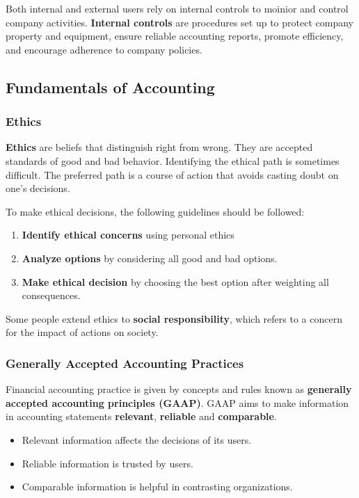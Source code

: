 \documentclass[../main.tex]{subfiles}
\begin{document}
	Both internal and external users rely on internal controls to moinior and 
	control company activities. \textbf{Internal controls} are procedures set 
	up to protect company property and equipment, ensure reliable accounting 
	reports, promote efficiency, and encourage adherence to company policies. 
	
	\subsection{Fundamentals of Accounting}
	
	\subsubsection{Ethics}
	\textbf{Ethics} are beliefs that distinguish right from wrong. They are 
	accepted standards of good and bad behavior. Identifying the ethical path 
	is sometimes difficult. The preferred path is a course of action that 
	avoids casting doubt on one's decisions. 
	
	To make ethical decisions, the following guidelines should be followed:
	\begin{enumerate}[noitemsep]
		\item \textbf{Identify ethical concerns} using personal ethics
		\item \textbf{Analyze options} by considering all good and bad options.
		\item \textbf{Make ethical decision} by choosing the best option after 
		weighting all consequences.
	\end{enumerate}
	
	Some people extend ethics to \textbf{social responsibility}, which refers 
	to a concern for the impact of actions on society. 
	
	\subsubsection{Generally Accepted Accounting Practices}
	
	Financial accounting practice is given by concepts and rules known as 
	\textbf{generally accepted accounting principles (GAAP)}. GAAP aims to make 
	information in accounting statements \textbf{relevant}, \textbf{reliable} 
	and \textbf{comparable}.
	\begin{itemize}[noitemsep]
		\item Relevant information affects the decisions of its users.
		\item Reliable information is trusted by users.
		\item Comparable information is helpful in contrasting organizations. 
	\end{itemize}
	
\end{document}

